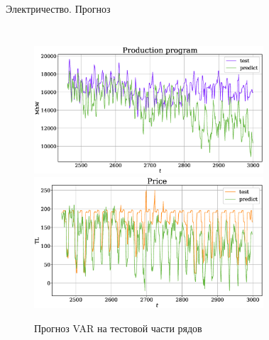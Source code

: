 	\begin{frame}{Электричество. Прогноз}
		
		\begin{columns}
			
			
			\begin{figure}[h]
				\centering
				
				\includegraphics[width=\textwidth, keepaspectratio]{img/electricity/var/prediction/Production_program.eps} 
				\includegraphics[width=\textwidth, keepaspectratio]{img/electricity/var/prediction/Price.eps}    
				\caption{Прогноз VAR на тестовой части рядов}
				
			\end{figure}
			
			
			\begin{figure}[h]
				\centering
				

\end{figure}
\end{columns}
\end{frame}
